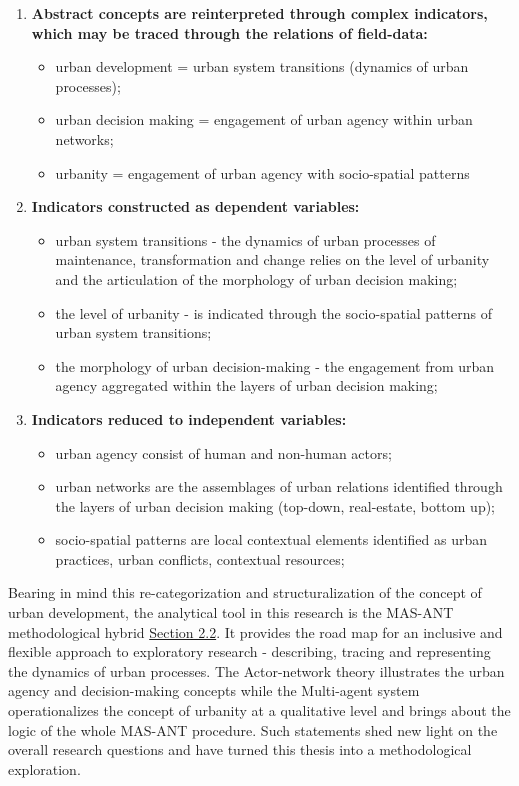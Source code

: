 \documentclass[11pt]{report}
\begin{document}
\begin{enumerate}
\item \textbf{Abstract concepts are reinterpreted through complex indicators, which may be traced through the relations of field-data:}

\begin{itemize}
\item urban development = urban system transitions (dynamics of urban processes);
\item urban decision making = engagement of urban agency within urban networks;
\item urbanity = engagement of urban agency with socio-spatial patterns
\end{itemize}

\item \textbf{Indicators constructed as dependent variables:}
\begin{itemize}
\item urban system transitions - the dynamics of urban processes of maintenance, transformation and change relies on the level of urbanity and the articulation of the morphology of urban decision making;
\item the level of urbanity - is indicated through the socio-spatial patterns of urban system transitions;
\item the morphology of urban decision-making - the engagement from urban agency aggregated within the layers of urban decision making;
\end{itemize}

\item \textbf{Indicators reduced to independent variables:}
\begin{itemize}
\item urban agency consist of human and non-human actors;
\item urban networks are the assemblages of urban relations identified through the layers of urban decision making (top-down, real-estate, bottom up);
\item socio-spatial patterns are local contextual elements identified as urban practices, urban conflicts, contextual resources;
\end{itemize}
\end{enumerate}

Bearing in mind this re-categorization and structuralization of the concept of urban development, the analytical tool in this research is the MAS-ANT methodological hybrid \href{Section 2.2}{Section 2.2}. 
It provides the road map for an inclusive and flexible approach to exploratory research - describing, tracing and representing the dynamics of urban processes. The Actor-network theory illustrates the urban agency and decision-making concepts while the Multi-agent system operationalizes the concept of urbanity at a qualitative level and brings about the logic of the whole MAS-ANT procedure. Such statements shed new light on the overall research questions and have turned this thesis into a methodological exploration.
\\
\end{document}
